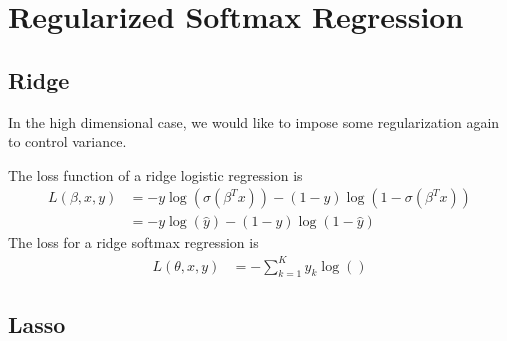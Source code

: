\section{Regularized Softmax Regression} 

\subsection{Ridge} 

  In the high dimensional case, we would like to impose some regularization again to control variance. 

  \begin{definition}[Loss]
    The loss function of a ridge logistic regression is 
    \begin{align}
      L(\beta, x, y) & = - y \log(\sigma(\beta^T x)) - (1 - y) \log(1 - \sigma(\beta^T x)) \\ 
                     & = -y \log(\hat{y}) - (1 - y) \log (1 - \hat{y})
    \end{align}
    The loss for a ridge softmax regression is 
    \begin{align}
      L(\theta, x, y) & = - \sum_{k=1}^K y_k \log ()
    \end{align}
  \end{definition}

\subsection{Lasso} 

